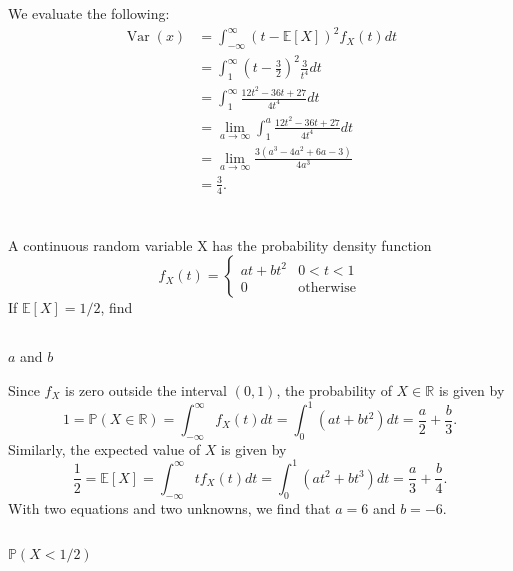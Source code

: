 \documentclass[12pt]{article}
\newenvironment{problem}
    {\begin{lrbox}{\mybox}\begin{minipage}{0.98\textwidth}}
    {\end{minipage}\end{lrbox}\framebox[\textwidth]{\usebox{\mybox}}}
\newcommand{\R}{\mathbb{R}}
\renewcommand{\P}{\mathbb{P}}
\newcommand{\E}{\mathbb{E}}
\newcommand{\Var}{\operatorname{Var}}
\begin{document}
We evaluate the following:
\begin{align*}
    \Var(x)
        &= \int_{-\infty}^\infty \left( t - \E[X] \right)^2 f_X(t) dt \\[1em]
        &= \int_1^\infty \left( t - \frac32 \right)^2 \frac{3}{t^4} dt \\[1em]
        &= \int_1^\infty \frac{12t^2 - 36t + 27}{4t^4} dt \\[1em]
        &= \lim_{a \to \infty} \int_1^a \frac{12t^2 - 36t + 27}{4t^4} dt \\[1em]
        &= \lim_{a \to \infty} \frac{3 (a^3 - 4a^2 + 6a -3)}{4a^3} \\[1em]
        &= \frac34.
\end{align*}

\newpage
\section{}
\begin{problem}
    A continuous random variable X has the probability density function
    \[
        f_X(t) = \begin{cases}
            at + bt^2   & 0 < t < 1 \\
            0           & \text{otherwise}
        \end{cases}
    \]
    If $\E[X] = 1/2$, find
\end{problem}

\subsection{}
\begin{problem}
    $a$ and $b$
\end{problem}
\medskip

Since $f_X$ is zero outside the interval $(0, 1)$, the probability of $X \in \R$ is given by
\[
    1 = \P(X \in \R) = \int_{-\infty}^{\infty} f_X(t) dt = \int_0^1 (at + bt^2) dt = \frac{a}{2} + \frac{b}{3}.
\]
Similarly, the expected value of $X$ is given by
\[
    \frac12 = \E[X] = \int_{-\infty}^{\infty} tf_X(t) dt = \int_0^1 (at^2 + bt^3) dt = \frac{a}{3} + \frac{b}{4}.
\]
With two equations and two unknowns, we find that $a = 6$ and $b = -6$.

\subsection{}
\begin{problem}
    $\P(X < 1/2)$
\end{problem}
\medskip
\end{document}
